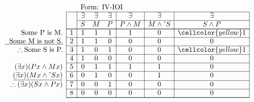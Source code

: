 \documentclass[10pt,legalpaper,landscape,cmtt]{article}
\begin{document}
{\begin{minipage}[t]{3.25in}
	\(
	\begin{array}{r|c|ccc|c|c|c|}
		\multicolumn{2}{c}{}&\multicolumn{6}{l}{\mbox{Form: IV-IOI}} \\ \cline{2-8}
		\hspace{1in}	&	& \exists & \exists & \exists & \exists & \exists & \exists\\ \cline{3-8}
		&	& S & M & P &  P \wedge M  &  M \wedge \tilde~S  &  S \wedge P \\ \cline{2-8} \cline{2-8}
		\phantom{\therefore}\mbox{Some P is M.}   & 1 & 1 & 1 & 1 &   1   &   0   &   \cellcolor{yellow} 1  \\ \cline{2-8}
		\underline{\phantom{\therefore}\mbox{Some M is not S.}}   & 2 & 1 & 1 & 0 &   0   &   0   &   0  \\ \cline{2-8}
		\therefore \mbox{Some S is P.}   & 3 & 1 & 0 & 1 &   0   &   0   &   \cellcolor{yellow} 1  \\ \cline{2-8}
		& 4 & 1 & 0 & 0 &   0   &   0   &   0  \\ \cline{2-8}
		(\exists x)(Px \wedge Mx)   & 5 & 0 & 1 & 1 &   1   &   1   &   0  \\ \cline{2-8}
		\underline{(\exists x)(Mx \wedge \tilde~Sx)}   & 6 & 0 & 1 & 0 &   0   &   1   &   0  \\ \cline{2-8}
		\therefore(\exists x)(Sx \wedge Px)   & 7 & 0 & 0 & 1 &   0   &   0   &   0  \\ \cline{2-8}
		& 8 & 0 & 0 & 0 &   0   &   0   &   0   \\ \cline{2-8}\cline{2-8} 
	\end{array}
	\)
\end{minipage}

}
\end{document}

